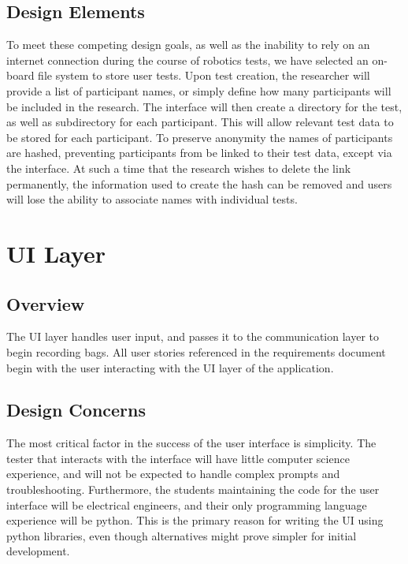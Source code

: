 \documentclass[onecolumn, draftclsnofoot,10pt, compsoc]{report}
\begin{document}
\subsection{Design Elements}
To meet these competing design goals, as well as the inability to rely on an internet connection during the course of robotics tests, we have selected an on-board file system to store user tests. Upon test creation, the researcher will provide a list of participant names, or simply define how many participants will be included in the research. The interface will then create a directory for the test, as well as subdirectory for each participant. This will allow relevant test data to be stored for each participant. To preserve anonymity the names of participants are hashed, preventing participants from be linked to their test data, except via the interface. At such a time that the research wishes to delete the link permanently, the information used to create the hash can be removed and users will lose the ability to associate names with individual tests.
\section{UI Layer}
\subsection{Overview}
The UI layer handles user input, and passes it to the communication layer to begin recording bags. All user stories referenced in the requirements document begin with the user interacting with the UI layer of the application.

\subsection{Design Concerns}
The most critical factor in the success of the user interface is simplicity. The tester that interacts with the interface will have little computer science experience, and will not be expected to handle complex prompts and troubleshooting. Furthermore, the students maintaining the code for the user interface will be electrical engineers, and their only programming language experience will be python. This is the primary reason for writing the UI using python libraries, even though alternatives might prove simpler for initial development.
\end{document}
